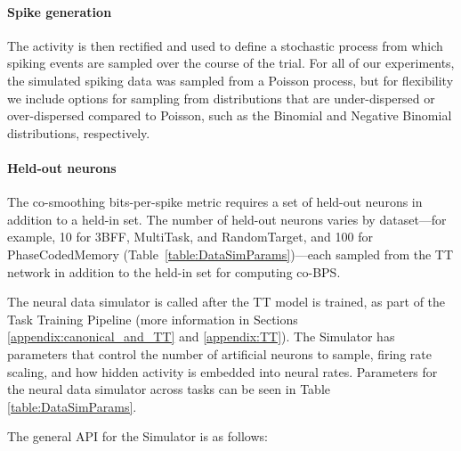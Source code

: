\documentclass{article}
\begin{document}
\paragraph{Spike generation}
The activity is then rectified and used to define a stochastic process from which spiking events are sampled over the course of the trial. For all of our experiments, the simulated spiking data was sampled from a Poisson process, but for flexibility we include options for sampling from distributions that are under-dispersed or over-dispersed compared to Poisson, such as the Binomial and Negative Binomial distributions, respectively.

\paragraph{Held-out neurons}
The co-smoothing bits-per-spike metric requires a set of held-out neurons in addition to a held-in set. The number of held-out neurons varies by dataset---for example, 10 for 3BFF, MultiTask, and RandomTarget, and 100 for PhaseCodedMemory (Table~\ref{table:DataSimParams})---each sampled from the TT network in addition to the held-in set for computing co-BPS.

The neural data simulator is called after the TT model is trained, as part of the Task Training Pipeline (more information in Sections \ref{appendix:canonical_and_TT} and \ref{appendix:TT}). The Simulator has parameters that control the number of artificial neurons to sample, firing rate scaling, and how hidden activity is embedded into neural rates. Parameters for the neural data simulator across tasks can be seen in Table \ref{table:DataSimParams}.

The general API for the Simulator is as follows:
\end{document}
